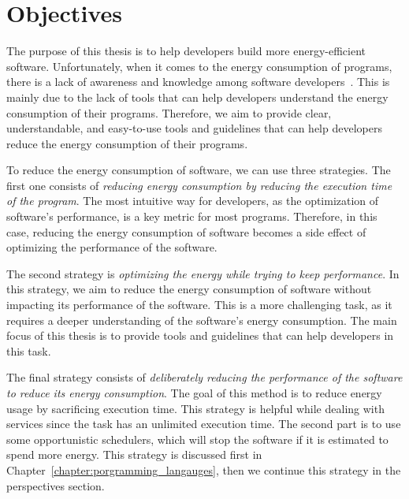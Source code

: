 \section{Objectives}
The purpose of this thesis is to help developers build more energy-efficient software.
Unfortunately, when it comes to the energy consumption of programs, there is a lack of awareness and knowledge among software developers~\cite{ournani2020reducing,pang2015programmers,pinto2014mining}.
This is mainly due to the lack of tools that can help developers understand the energy consumption of their programs.
Therefore, we aim to provide clear, understandable, and easy-to-use tools and guidelines that can help developers reduce the energy consumption of their programs.

To reduce the energy consumption of software, we can use three strategies.
The first one consists of \emph{reducing energy consumption by reducing the execution time of the program}.
The most intuitive way for developers, as the optimization of software's performance, is a key metric for most programs.
Therefore, in this case, reducing the energy consumption of software becomes a side effect of optimizing the performance of the software.

The second strategy is \emph{optimizing the energy while trying to keep performance}.
In this strategy, we aim to reduce the energy consumption of software without impacting its performance of the software.
This is a more challenging task, as it requires a deeper understanding of the software's energy consumption.
The main focus of this thesis is to provide tools and guidelines that can help developers in this task.

The final strategy consists of \emph{deliberately reducing the performance of the software to reduce its energy consumption}.
The goal of this method is to reduce energy usage by sacrificing execution time.
This strategy is helpful while dealing with services since the task has an unlimited execution time.
The second part is to use some opportunistic schedulers, which will stop the software if it is estimated to spend more energy.
This strategy is discussed first in Chapter~\ref{chapter:porgramming_langauges}, then we continue this strategy in the perspectives section.


